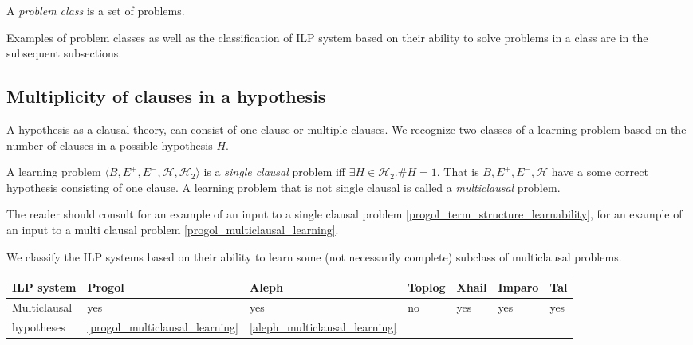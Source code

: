 \begin{defn}
A \emph{problem class} is a set of problems.
\end{defn}

Examples of problem classes as well as the classification of ILP system based on their ability to solve problems in a class are in the subsequent subsections.

\subsection{Multiplicity of clauses in a hypothesis}
A hypothesis as a clausal theory, can consist of one clause or multiple clauses. 
We recognize two classes of a learning problem based on the number of clauses in a possible hypothesis $H$.

\begin{defn}
A learning problem $\langle B, E^+, E^-, \mathcal{H}, \mathcal{H}_2 \rangle$ is a 
\emph{single clausal} problem iff $\exists H \in \mathcal{H}_2. \#H = 1$. That is $B, E^+, E^-, \mathcal{H}$ have a some correct hypothesis consisting of one clause.
A learning problem that is not single clausal is called a \emph{multiclausal} problem.
\end{defn}

The reader should consult for an example of an input to a single clausal problem \ref{progol_term_structure_learnability}, for an example of an input to a multi clausal problem \ref{progol_multiclausal_learning}.

We classify the ILP systems based on their ability to learn some (not necessarily complete) subclass of multiclausal problems.

\begin{center}
 \label{classification_multiclausal_hypotheses} 
\begin{tabular}{| l | l | l | l | l | l | l |}
    \hline
    ILP system & Progol & Aleph & Toplog & Xhail & Imparo & Tal \\ \hline
    Multiclausal& yes & yes & no & 
    yes & yes & yes \\ 
     hypotheses & \ref{progol_multiclausal_learning} &\ref{aleph_multiclausal_learning}&
     \cite{muggleton2012mc}&\cite{muggleton2012mc}&\cite{muggleton2012mc}&
     \cite{muggleton2012mc}\\ 
    \hline
\end{tabular}
\end{center}

